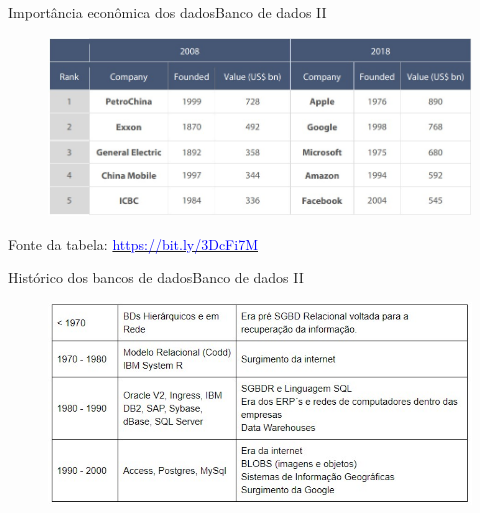 \documentclass[t]{beamer}
\begin{document}

\begin{ftst}{Importância econômica dos dados}{Banco de dados II}
\begin{figure}
    \centering
    \includegraphics[scale=0.5]{Figuras/slide00_05.jpg}
\end{figure}
\vone
\vone
\vone
\scriptsize
Fonte da tabela: \href{https://bit.ly/3DcFi7M}{\textcolor{blue}{https://bit.ly/3DcFi7M}}

\end{ftst}


\begin{ftst}{Histórico dos bancos de dados}{Banco de dados II}

\begin{figure}
    \centering
    \includegraphics[scale=0.65]{Figuras/hist1.jpg}
\end{figure}


\end{ftst}


\end{document}
